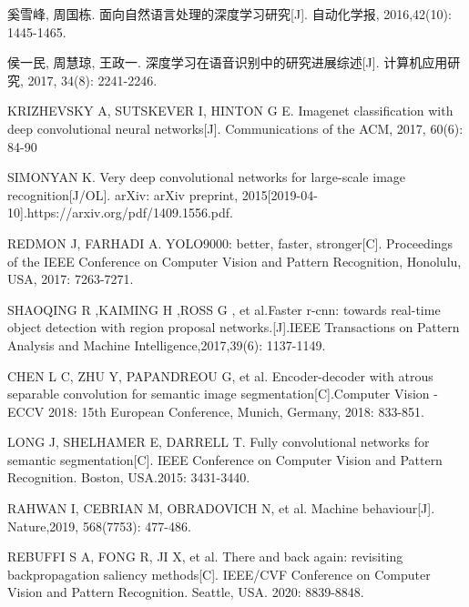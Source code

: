 



\begin{thebibliography}{200}
\wuhao %
\linespread{1}\selectfont
\setlength{\itemsep}{-1.4ex} %
\thispagestyle{others}
\pagestyle{others}

\makeatletter
\renewcommand\@biblabel[1]{[#1]\hfill} %
\makeatother
\setlength{\labelsep}{0cm}

奚雪峰, 周国栋. 面向自然语言处理的深度学习研究[J]. 自动化学报, 2016,42(10): 1445-1465.

侯一民, 周慧琼, 王政一. 深度学习在语音识别中的研究进展综述[J]. 计算机应用研究, 2017, 34(8): 2241-2246.

KRIZHEVSKY A, SUTSKEVER I, HINTON G E. Imagenet classification with deep convolutional neural networks[J]. Communications of the ACM, 2017, 60(6): 84-90

SIMONYAN K. Very deep convolutional networks for large-scale image recognition[J/OL]. arXiv: arXiv preprint, 2015[2019-04-10].https://arxiv.org/pdf/1409.1556.pdf.

REDMON J, FARHADI A. YOLO9000: better, faster, stronger[C]. Proceedings of the IEEE Conference on Computer Vision and Pattern Recognition, Honolulu, USA, 2017: 7263-7271.

SHAOQING R ,KAIMING H ,ROSS G , et al.Faster r-cnn: towards real-time object detection with region proposal networks.[J].IEEE Transactions on Pattern Analysis and Machine Intelligence,2017,39(6): 1137-1149.

CHEN L C, ZHU Y, PAPANDREOU G, et al. Encoder-decoder with atrous separable convolution for semantic image segmentation[C].Computer Vision - ECCV 2018: 15th European Conference, Munich, Germany, 2018: 833-851.

LONG J, SHELHAMER E, DARRELL T. Fully convolutional networks for semantic segmentation[C]. IEEE Conference on Computer Vision and Pattern Recognition. Boston, USA.2015: 3431-3440.

RAHWAN I, CEBRIAN M, OBRADOVICH N, et al. Machine behaviour[J]. Nature,2019, 568(7753): 477-486.

REBUFFI S A, FONG R, JI X, et al. There and back again: revisiting backpropagation saliency methods[C]. IEEE/CVF Conference on Computer Vision and Pattern Recognition. Seattle, USA. 2020: 8839-8848.


\end{thebibliography}
